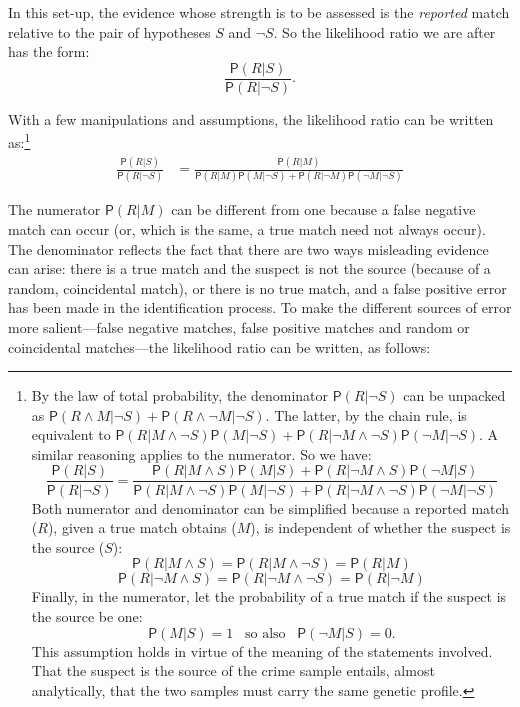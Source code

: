 \documentclass[
  10pt,
  dvipsnames,enabledeprecatedfontcommands]{scrartcl}
\newcommand{\n}{\neg}
\newcommand{\et}{\wedge}
\newcommand{\pr}[1]{\mathsf{P}(#1)}
\begin{document}
In this set-up, the evidence whose strength is to be assessed is the
\textit{reported} match relative to the pair of hypotheses \(S\) and
\(\neg S\). So the likelihood ratio we are after has the form:
\[\frac{\pr{R \vert S}}{\pr{R \vert \neg S}}.\]

\noindent With a few manipulations and assumptions, the likelihood ratio
can be written as:\footnote{By the law of total probability, the
  denominator \(\pr{R \vert \neg S}\) can be unpacked as
  \(\pr{R \wedge M \vert \neg S} + \pr{R \wedge \neg M | \neg S}\). The
  latter, by the chain rule, is equivalent to
  \(\pr{R \vert M \wedge \neg S}\pr{ M \vert \n S} + \pr{R \vert \n M \wedge \neg S}\pr{\n M \vert \n S}\).
  A similar reasoning applies to the numerator. So we have:
  \[\frac{\pr{R \vert S}}{\pr{R \vert \neg S}} = \frac{\pr{R \vert M \et S}\pr{M \vert S} + \pr{R \vert \n M \et S}\pr{\n M \vert S}} {\pr{R \vert M \et \n S}\pr{M \vert \n S} + \pr{R \vert \n M \et \n S}\pr{\n M \vert \n S}}
  \] Both numerator and denominator can be simplified because a reported
  match (\(R\)), given a true match obtains (\(M\)), is independent of
  whether the suspect is the source (\(S\)):
  \[\pr{R \vert M \et S} = \pr{R \vert M \et \n S} = \pr{R \vert M}\]
  \[\pr{R \vert \n M \et S} = \pr{R \vert\n M \et \n S} = \pr{R \vert \n M}\]
  Finally, in the numerator, let the probability of a true match if the
  suspect is the source be one:
  \[\pr{M\vert S} = 1  \,\,\, \mbox{ so also } \,\,\, \pr{\n M \vert S}=0.\]
  This assumption holds in virtue of the meaning of the statements
  involved. That the suspect is the source of the crime sample entails,
  almost analytically, that the two samples must carry the same genetic
  profile.} \begin{align}
\label{eq:LRfp4}
\frac{\pr{R \vert S}}{\pr{R \vert \neg S}} & = \frac{
\pr{R \vert M}
}{
\pr{R \vert M }\pr{M \vert \n S} +
\pr{R \vert \n M}\pr{\n M \vert \n S}
}
\end{align}

\noindent The numerator \(\pr{R \vert M}\) can be different from one
because a false negative match can occur (or, which is the same, a true
match need not always occur). The denominator reflects the fact that
there are two ways misleading evidence can arise: there is a true match
and the suspect is not the source (because of a random, coincidental
match), or there is no true match, and a false positive error has been
made in the identification process. To make the different sources of
error more salient---false negative matches, false positive matches and
random or coincidental matches---the likelihood ratio can be written, as
follows:
\end{document}
